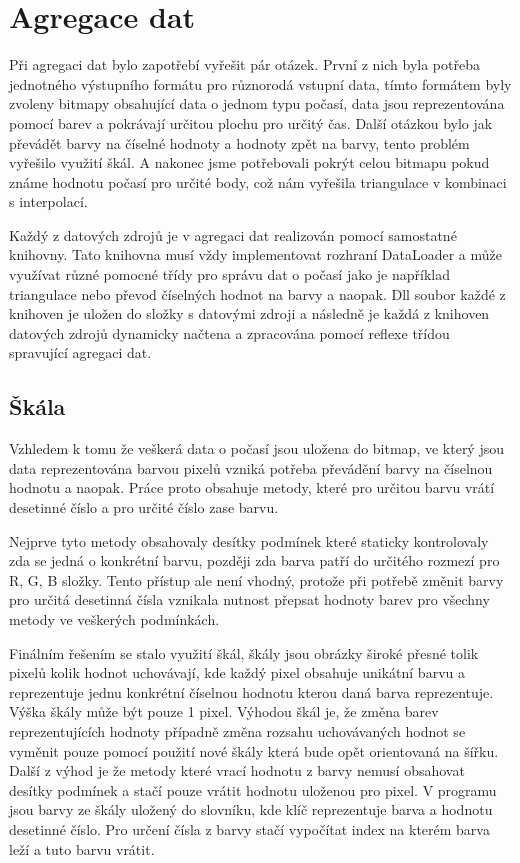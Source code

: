 \documentclass[czech,bachelor,dept460,male,csharp,cpdeclaration]{diploma}
\begin{document}
	\chapter{Agregace dat}
	
	Při agregaci dat bylo zapotřebí vyřešit pár otázek. První z nich byla potřeba jednotného výstupního formátu pro různorodá vstupní data, tímto formátem byly zvoleny bitmapy obsahující data o jednom typu počasí, data jsou reprezentována pomocí barev a pokrávají určitou plochu pro určitý čas. Další otázkou bylo jak převádět barvy na číselné hodnoty a hodnoty zpět na barvy, tento problém vyřešilo využití škál. A nakonec jsme potřebovali pokrýt celou bitmapu pokud známe hodnotu počasí pro určité body, což nám vyřešila triangulace v kombinaci s interpolací.
	
	Každý z datových zdrojů je v agregaci dat realizován pomocí samostatné knihovny. Tato knihovna musí vždy implementovat rozhraní DataLoader a může využívat různé pomocné třídy pro správu dat o počasí jako je například triangulace nebo převod číselných hodnot na barvy a naopak. Dll soubor každé z knihoven je uložen do složky s datovými zdroji a následně je každá z knihoven datových zdrojů dynamicky načtena a zpracována pomocí reflexe třídou spravující agregaci dat.
	
	\section{Škála}
	
	Vzhledem k tomu že veškerá data o počasí jsou uložena do bitmap, ve který jsou data reprezentována barvou pixelů vzniká potřeba převádění barvy na číselnou hodnotu a naopak. Práce proto obsahuje metody, které pro určitou barvu vrátí desetinné číslo a pro určité číslo zase barvu.
	
	Nejprve tyto metody obsahovaly desítky podmínek které staticky kontrolovaly zda se jedná o konkrétní barvu, později zda barva patří do určitého rozmezí pro R, G, B složky. Tento přístup ale není vhodný, protože při potřebě změnit barvy pro určitá desetinná čísla vznikala nutnost přepsat hodnoty barev pro všechny metody ve veškerých podmínkách.
	
	Finálním řešením se stalo využití škál, škály jsou obrázky široké přesné tolik pixelů kolik hodnot uchovávají, kde každý pixel obsahuje unikátní barvu a reprezentuje jednu konkrétní číselnou hodnotu kterou daná barva reprezentuje. Výška škály může být pouze 1 pixel. Výhodou škál je, že změna barev reprezentujících hodnoty případně změna rozsahu uchovávaných hodnot se vyměnit pouze pomocí použití nové škály která bude opět orientovaná na šířku. Další z výhod je že metody které vrací hodnotu z barvy nemusí obsahovat desítky podmínek a stačí pouze vrátit hodnotu uloženou pro pixel. V programu jsou barvy ze škály uložený do slovníku, kde klíč reprezentuje barva a hodnotu desetinné číslo. Pro určení čísla z barvy stačí vypočítat index na kterém barva leží a tuto barvu vrátit.
	
\end{document}
